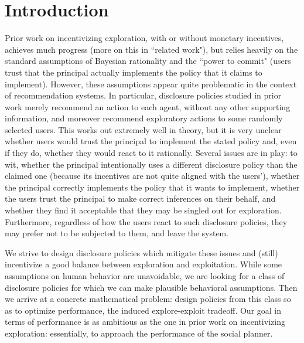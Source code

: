 \section{Introduction}
\label{sec:intro}



 Prior work on incentivizing exploration, with or without monetary incentives, achieves much progress (more on this in ``related work"), but relies heavily on the standard assumptions of Bayesian rationality and the ``power to commit" (\ie users trust that the principal actually implements the policy that it claims to implement). However, these assumptions appear quite problematic in the context of recommendation systems. In particular, disclosure policies studied in prior work merely recommend an action to each agent, without any other supporting information, and moreover recommend exploratory actions to some randomly selected users. This works out extremely well in theory, but it is very unclear whether users would trust the principal to implement the stated policy and, even if they do, whether they would react to it rationally. Several issues are in play: to wit, whether the principal intentionally uses a different disclosure policy than the claimed one (\eg because its incentives are not quite aligned with the users'), whether the principal correctly implements the policy that it wants to implement, whether the users trust the principal to make correct inferences on their behalf, and whether they find it acceptable that they may be singled out for exploration. Furthermore, regardless of how the users react to such disclosure policies, they may prefer not to be subjected to them, and leave the system.

We strive to design disclosure policies which mitigate these issues and (still) incentivize a good balance between exploration and exploitation. While some assumptions on human behavior are unavoidable, we are looking for a class of disclosure policies for which we can make plausible behavioral assumptions. Then we arrive at a concrete mathematical problem: design policies from this class so as to optimize performance, \ie  the induced explore-exploit tradeoff. Our goal in terms of performance is as ambitious as the one in prior work on incentivizing exploration: essentially, to approach the performance of the social planner.


